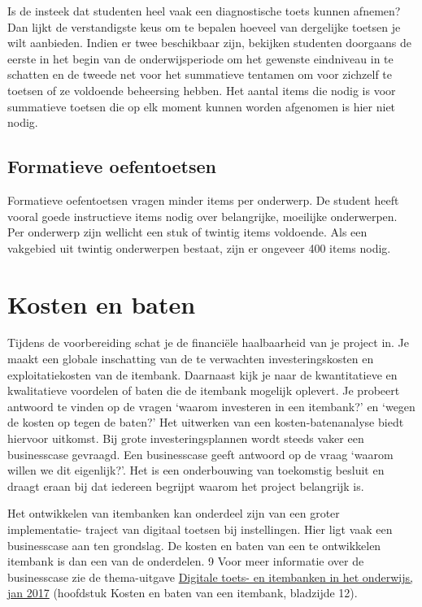 \documentclass[
]{book}
\begin{document}
Is de insteek dat studenten heel vaak een diagnostische toets kunnen afnemen? Dan lijkt de verstandigste keus om te bepalen hoeveel van dergelijke toetsen je wilt aanbieden. Indien er twee beschikbaar zijn, bekijken studenten doorgaans de eerste in het begin van de onderwijsperiode om het gewenste eindniveau in te schatten en de tweede net voor het summatieve tentamen om voor zichzelf te toetsen of ze voldoende beheersing hebben. Het aantal items die nodig is voor summatieve toetsen die op elk moment kunnen worden afgenomen is hier niet nodig.

\hypertarget{formatieve-oefentoetsen}{%
\subsection{Formatieve oefentoetsen}\label{formatieve-oefentoetsen}}

Formatieve oefentoetsen vragen minder items per onderwerp. De student heeft vooral goede instructieve items nodig over belangrijke, moeilijke onderwerpen. Per onderwerp zijn wellicht een stuk of twintig items voldoende. Als een vakgebied uit twintig onderwerpen bestaat, zijn er ongeveer 400 items nodig.

\hypertarget{kosten-en-baten}{%
\section{Kosten en baten}\label{kosten-en-baten}}

Tijdens de voorbereiding schat je de financiële haalbaarheid van je project in. Je maakt een globale inschatting van de te verwachten investeringskosten en exploitatiekosten van de itembank. Daarnaast kijk je naar de kwantitatieve en kwalitatieve voordelen of baten die de itembank mogelijk oplevert. Je probeert antwoord te vinden op de vragen `waarom investeren in een itembank?' en `wegen de kosten op tegen de baten?' Het uitwerken van een kosten-batenanalyse biedt hiervoor uitkomst. Bij grote investeringsplannen wordt steeds vaker een businesscase gevraagd. Een businesscase geeft antwoord op de vraag `waarom willen we dit eigenlijk?'. Het is een onderbouwing van toekomstig besluit en draagt eraan bij dat iedereen begrijpt waarom het project belangrijk is.

Het ontwikkelen van itembanken kan onderdeel zijn van een groter implementatie- traject van digitaal toetsen bij instellingen. Hier ligt vaak een businesscase aan ten grondslag. De kosten en baten van een te ontwikkelen itembank is dan een van de onderdelen. 9 Voor meer informatie over de businesscase zie de thema-uitgave \href{https://www.surf.nl/files/2019-02/thema-uitgave-itembanken_-webversie_def.pdf}{Digitale toets- en itembanken in het onderwijs, jan 2017} (hoofdstuk Kosten en baten van een itembank, bladzijde 12).
\end{document}
